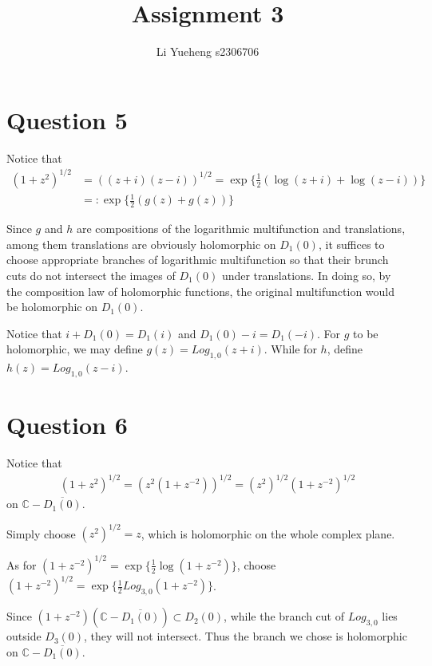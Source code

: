 \documentclass{article}
\begin{document}
\title{Assignment 3}
\author{Li Yueheng s2306706}

\maketitle


\section*{Question 5}

Notice that 
\begin{align*}
	(1+z^2)^{1/2}&=((z+i)(z-i))^{1/2}=\exp\{\frac{1}{2}(\log(z+i)+\log(z-i))\} \\
	&=:\exp\{\frac{1}{2}(g(z)+g(z))\}
\end{align*}

Since $g$ and $h$ are compositions of the logarithmic multifunction and translations, among them translations are obviously holomorphic on $D_1(0)$, it suffices to choose appropriate branches of logarithmic multifunction so that their brunch cuts do not intersect the images of $D_1(0)$ under translations. In doing so, by the composition law of holomorphic functions, the original multifunction would be holomorphic on $D_1(0)$.

Notice that $i+D_1(0)=D_1(i)$ and $D_1(0)-i=D_1(-i)$. For $g$ to be holomorphic, we may define $g(z)=Log_{1,0}(z+i)$. While for $h$, define $h(z)=Log_{1,0}(z-i)$.

\section*{Question 6}
Notice that 
\begin{align*}
	(1+z^2)^{1/2}=(z^2(1+z^{-2}))^{1/2}=(z^2)^{1/2}(1+z^{-2})^{1/2}
\end{align*}
on $\mathbb{C}-\overline{D_1(0)}$.

Simply choose $(z^2)^{1/2}=z$, which is holomorphic on the whole complex plane. 

As for $(1+z^{-2})^{1/2}=\exp\{\frac{1}{2}\log(1+z^{-2})\}$, choose $(1+z^{-2})^{1/2}=\exp\{\frac{1}{2}Log_{3,0}(1+z^{-2})\}$. 

Since $(1+z^{-2})(\mathbb{C}-\overline{D_1(0)})\subset D_2(0)$, while the branch cut of $Log_{3,0}$ lies outside $D_3(0)$, they will not intersect. Thus the branch we chose is holomorphic on $\mathbb{C}-\overline{D_1(0)}$.
\end{document}
